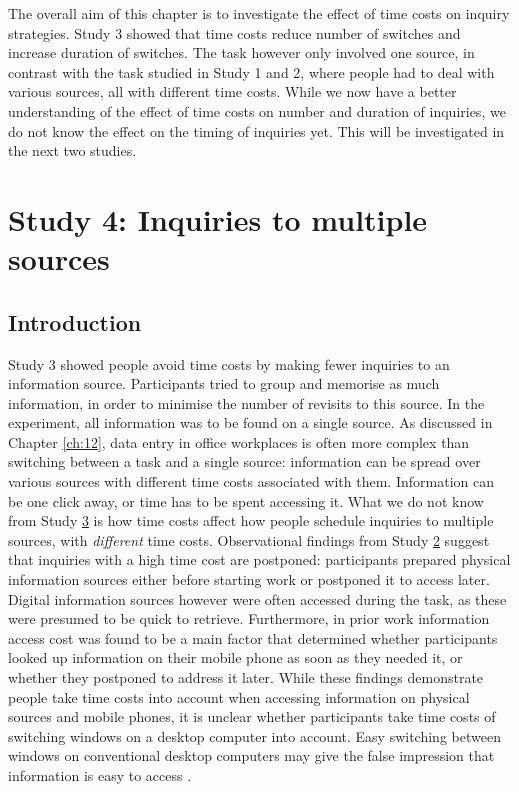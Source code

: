 The overall aim of this chapter is to investigate the effect of time costs on inquiry strategies. Study 3 showed that time costs reduce number of switches and increase duration of switches. The task however only involved one source, in contrast with the task studied in Study 1 and 2, where people had to deal with various sources, all with different time costs. While we now have a better understanding of the effect of time costs on number and duration of inquiries, we do not know the effect on the timing of inquiries yet. This will be investigated in the next two studies.


\section{Study 4: Inquiries to multiple sources}\label{st:Study4}
 
\subsection{Introduction}
Study 3 showed people avoid time costs by making fewer inquiries to an information source. Participants tried to group and memorise as much information, in order to minimise the number of revisits to this source. In the experiment, all information was to be found on a single source. As discussed in Chapter \ref{ch:12}, data entry in office workplaces is often more complex than switching between a task and a single source: information can be spread over various sources with different time costs associated with them. Information can be one click away, or time has to be spent accessing it. What we do not know from Study \hyperref[st:Study3]{3} is how time costs affect how people schedule inquiries to multiple sources, with \textit{different} time costs. Observational findings from Study \hyperref[st:Study2]{2} suggest that inquiries with a high time cost are postponed: participants prepared physical information sources either before starting work or postponed it to access later. Digital information sources however were often accessed during the task, as these were presumed to be quick to retrieve. Furthermore, in prior work \citep{Sohn2008} information access cost was found to be a main factor that determined whether participants looked up information on their mobile phone as soon as they needed it, or whether they postponed to address it later. While these findings demonstrate people take time costs into account when accessing information on physical sources and mobile phones, it is unclear whether participants take time costs of switching windows on a desktop computer into account. Easy switching between windows on conventional desktop computers may give the false impression that information is easy to access \citep{Sellen2003}. 


